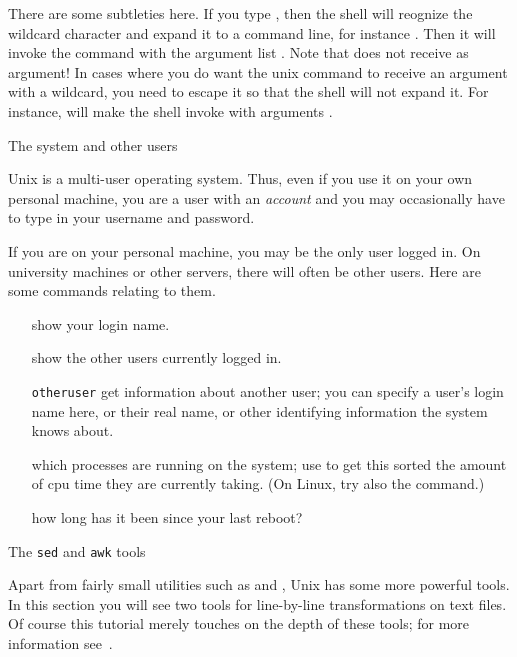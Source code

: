 There are some subtleties here. If you type , then the shell
will reognize the wildcard character and expand it to a command line,
for instance . Then it will invoke the 
command with the argument list . Note that  does
not receive  as argument! In cases where you do want the unix
command to receive an argument with a wildcard, you need to escape it
so that the shell will not expand it. For instance,  will make the shell invoke  with arguments .

 {The system and other users}
\label{sec:users}

Unix is a multi-user operating system. Thus, even if you use it
on your own personal machine, you are a user with an \emph{account}
and you may occasionally
have to type in your username and password.

If you are on your personal machine, you may be the only user logged
in. On university machines or other servers, there will often be other
users. Here are some commands relating to them.

\begin{itemize}
\item [\indextermunix{whoami}] show your login name.
\item [\indextermunix{who}] show the other users currently logged in.
\item [\indextermunix{finger} {\tt otheruser}] get information about another user;
  you can specify a user's login name here, or their real name,
  or other identifying information the system knows about.
\item [\indextermunix{top}] which processes are running on the system; use
   to get this sorted the amount of cpu time they are
  currently taking. (On Linux, try also the  command.)
\item [\indextermunix{uptime}] how long has it been since your last reboot?
\end{itemize}

 {The {\tt sed} and {\tt awk} tools}

Apart from fairly small utilities such as  and , Unix
has some more powerful tools. In this section you will see two tools for
line-by-line transformations on text files. Of course this tutorial
merely touches on the depth of these tools; for more information
see~\cite{AWK:awk,OReilly:sedawk}.


